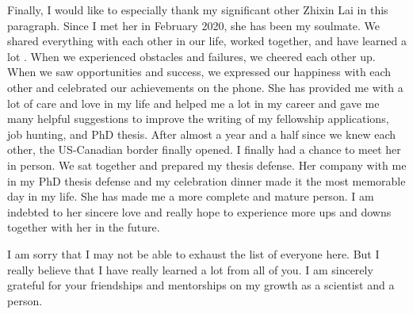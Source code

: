 Finally, I would like to especially thank my significant other Zhixin Lai in this paragraph. Since I met her in February 2020, she has been my soulmate. We shared everything with each other in our life, worked together, and have learned a lot . When we experienced obstacles and failures, we cheered each other up. When we saw opportunities and success, we expressed our happiness with each other and celebrated our achievements on the phone. She has provided me with a lot of care and love in my life and helped me a lot in my career and gave me many helpful suggestions to improve the writing of my fellowship applications, job hunting, and PhD thesis. After almost a year and a half since we knew each other, the US-Canadian border finally opened. I finally had a chance to meet her in person. We sat together and prepared my thesis defense. Her company with me in my PhD thesis defense and my celebration dinner made it the most memorable day in my life. She has made me a more complete and mature person. I am indebted to her sincere love and really hope to experience more ups and downs together with her in the future.



















I am sorry that I may not be able to exhaust the list of everyone here. But I really believe that I have really learned a lot from all of you. I am sincerely grateful for your friendships and mentorships on my growth as a scientist and a person. 

